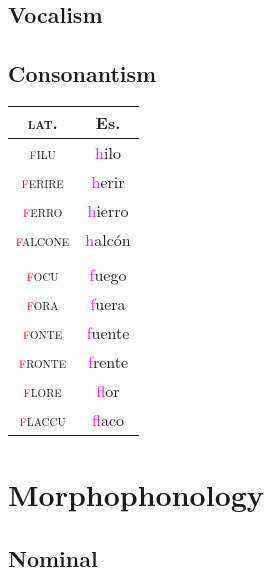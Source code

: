 \documentclass{report}
\begin{document}
\subsection{Vocalism}

\subsection{Consonantism}

\begin{tcolorbox}[title=Debuccalization of /f/]
  
\end{tcolorbox}

\begin{tabular}{c c}
  \textsc{lat.} & Es. \\
  \hline
  \textsc{\textcolor{red}{f}ilu} & \textcolor{magenta}{h}ilo \\
  \textsc{\textcolor{red}{f}erire} & \textcolor{magenta}{h}erir \\
  \textsc{\textcolor{red}{f}erro} & \textcolor{magenta}{h}ierro \\
  \textsc{\textcolor{red}{f}alcone} & \textcolor{magenta}{h}alcón \\
                & \\
  \textsc{\textcolor{red}{f}ocu} & \textcolor{magenta}{f}uego \\
  \textsc{\textcolor{red}{f}ora} & \textcolor{magenta}{f}uera \\
  \textsc{\textcolor{red}{f}onte} & \textcolor{magenta}{f}uente \\
  \textsc{\textcolor{red}{f}ronte} & \textcolor{magenta}{f}rente \\
  \textsc{\textcolor{red}{f}lore} & \textcolor{magenta}{f}lor \\
  \textsc{\textcolor{red}{f}laccu} & \textcolor{magenta}{f}laco \\
\end{tabular}

\begin{tcolorbox}[title=Betacism II]

\end{tcolorbox}

\section{Morphophonology}

\subsection{Nominal}
\end{document}

